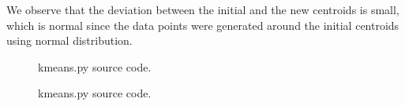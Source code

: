\documentclass[11pt]{article}
\begin{document}
	We observe that the deviation between the initial and the new centroids is small, which is normal since the data points were generated around the initial centroids using normal distribution.
	
	\begin{figure}[H]
		\caption{kmeans.py source code.}
	\end{figure}
	
	\begin{figure}[H]
		\caption{kmeans.py source code.}
	\end{figure}
	
\end{document}
